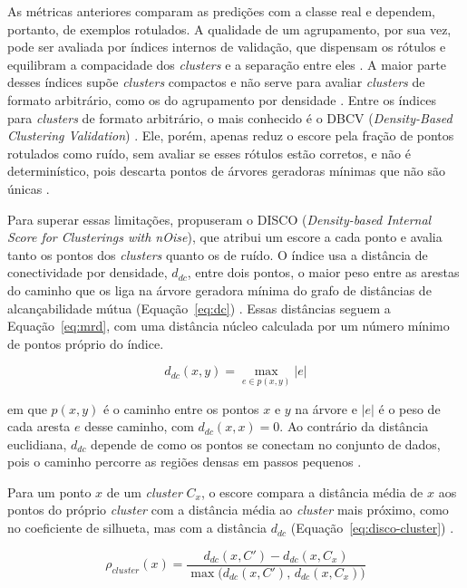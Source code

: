 \documentclass{uflamon}          %
\begin{document}
As métricas anteriores comparam as predições com a classe real e dependem, portanto, de exemplos rotulados. A qualidade de um agrupamento, por sua vez, pode ser avaliada por índices internos de validação, que dispensam os rótulos e equilibram a compacidade dos \textit{clusters} e a separação entre eles \cite{beer2025}. A maior parte desses índices supõe \textit{clusters} compactos e não serve para avaliar \textit{clusters} de formato arbitrário, como os do agrupamento por densidade \cite{beer2025}. Entre os índices para \textit{clusters} de formato arbitrário, o mais conhecido é o DBCV (\textit{Density-Based Clustering Validation}) \cite{moulavi2014}. Ele, porém, apenas reduz o escore pela fração de pontos rotulados como ruído, sem avaliar se esses rótulos estão corretos, e não é determinístico, pois descarta pontos de árvores geradoras mínimas que não são únicas \cite{beer2025}.

Para superar essas limitações,  propuseram o DISCO (\textit{Density-based Internal Score for Clusterings with nOise}), que atribui um escore a cada ponto e avalia tanto os pontos dos \textit{clusters} quanto os de ruído. O índice usa a distância de conectividade por densidade, $d_{dc}$, entre dois pontos, o maior peso entre as arestas do caminho que os liga na árvore geradora mínima do grafo de distâncias de alcançabilidade mútua (Equação~\ref{eq:dc}) \cite{beer2025}. Essas distâncias seguem a Equação~\ref{eq:mrd}, com uma distância núcleo calculada por um número mínimo de pontos próprio do índice.

\begin{equation}
    d_{dc}(x, y) = \max_{e \in p(x, y)} |e|
    \label{eq:dc}
\end{equation}

em que $p(x, y)$ é o caminho entre os pontos $x$ e $y$ na árvore e $|e|$ é o peso de cada aresta $e$ desse caminho, com $d_{dc}(x, x) = 0$. Ao contrário da distância euclidiana, $d_{dc}$ depende de como os pontos se conectam no conjunto de dados, pois o caminho percorre as regiões densas em passos pequenos \cite{beer2025}.

Para um ponto $x$ de um \textit{cluster} $C_x$, o escore compara a distância média de $x$ aos pontos do próprio \textit{cluster} com a distância média ao \textit{cluster} mais próximo, como no coeficiente de silhueta, mas com a distância $d_{dc}$ (Equação~\ref{eq:disco-cluster}) \cite{beer2025}.

\begin{equation}
    \rho_{cluster}(x) = \frac{d_{dc}(x, C') - d_{dc}(x, C_x)}{\max\big(d_{dc}(x, C'),\, d_{dc}(x, C_x)\big)}
    \label{eq:disco-cluster}
\end{equation}
\end{document}
